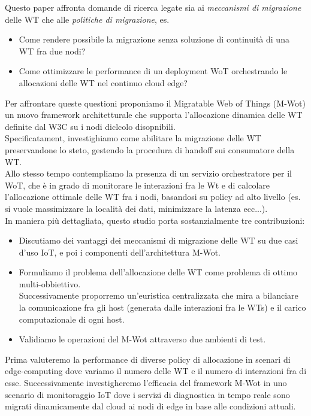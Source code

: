 \documentclass[11pt]{article}
\begin{document}
  Questo paper affronta domande di ricerca legate sia ai \textit{meccanismi di migrazione} delle WT che alle \textit{politiche di migrazione}, es.
  \begin{itemize}
  	\item Come rendere possibile la migrazione senza soluzione di continuità di una WT fra due nodi?
  	\item Come ottimizzare le performance di un deployment WoT orchestrando le allocazioni delle WT nel continuo cloud edge?
  \end{itemize}
  Per affrontare queste questioni proponiamo il Migratable Web of Things (M-Wot) un nuovo framework architetturale che supporta l'allocazione dinamica delle WT definite dal W3C su i nodi diclcolo disopnibili.\\
  Specificatament, investighiamo come abilitare la migrazione delle WT preservandone lo steto, gestendo la procedura di handoff sui consumatore della WT.\\
  Allo stesso tempo contempliamo la presenza di un servizio orchestratore per il WoT, che è in grado di monitorare le interazioni fra le Wt e di calcolare l'allocazione ottimale delle WT fra i nodi, basandosi su policy ad alto livello (es. si vuole massimizzare la località dei dati, minimizzare la latenza ecc...). \\
  In maniera più dettagliata, questo studio porta sostanzialmente tre contribuzioni:
  \begin{itemize}
  	\item Discutiamo dei vantaggi dei meccanismi di migrazione delle WT su due casi d'uso IoT, e poi i componenti dell'architettura M-Wot.
  	\item Formuliamo il problema dell'allocazione delle WT come problema di ottimo multi-obbiettivo. \\
  	Successivamente proporremo un'euristica centralizzata che mira a bilanciare la comunicazione fra gli host (generata dalle interazioni fra le WTs) e il carico computazionale di ogni host.
  	\item Validiamo le operazioni del M-Wot attraverso due ambienti di test.
	\end{itemize} 	 	
  	Prima valuteremo la performance di diverse policy di allocazione in scenari di edge-computing dove variamo il numero delle WT e il numero di interazioni fra di esse.
  	Successivamente investigheremo l'efficacia del framework M-Wot in uno scenario di monitoraggio IoT dove i servizi di diagnostica in tempo reale sono migrati dinamicamente dal cloud ai nodi di edge in base alle condizioni attuali. \\
  	
\end{document}
